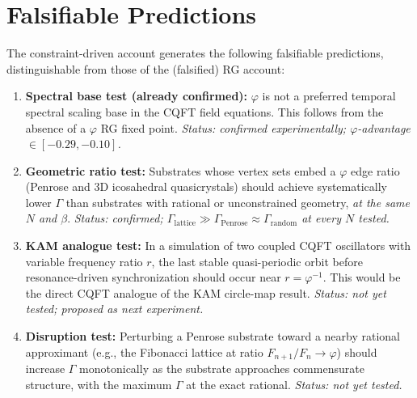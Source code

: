 \documentclass[11pt,a4paper]{article}
\theoremstyle{plain}
\theoremstyle{definition}
\newcommand{\phiGolden}{\varphi}
\begin{document}
\section{Falsifiable Predictions}
\label{sec:predictions}

The constraint-driven account generates the following falsifiable predictions,
distinguishable from those of the (falsified) RG account:

\begin{enumerate}[label=\textbf{P\arabic*.}, leftmargin=*, itemsep=6pt]

  \item \textbf{Spectral base test (already confirmed):}
    $\phiGolden$ is not a preferred temporal spectral scaling base in
    the CQFT field equations. This follows from the absence of a
    $\phiGolden$ RG fixed point. \emph{Status: confirmed experimentally;
    $\phiGolden$-advantage $\in [-0.29, -0.10]$.}

  \item \textbf{Geometric ratio test:}
    Substrates whose vertex sets embed a $\phiGolden$ edge ratio (Penrose
    and 3D icosahedral quasicrystals) should achieve systematically lower
    $\Gamma$ than substrates with rational or unconstrained geometry,
    \emph{at the same $N$ and $\beta$}. \emph{Status: confirmed;
    $\Gamma_{\text{lattice}} \gg \Gamma_{\text{Penrose}} \approx
    \Gamma_{\text{random}}$ at every $N$ tested.}

  \item \textbf{KAM analogue test:}
    In a simulation of two coupled CQFT oscillators with variable
    frequency ratio $r$, the last stable quasi-periodic orbit before
    resonance-driven synchronization should occur near $r = \phiGolden^{-1}$.
    This would be the direct CQFT analogue of the KAM circle-map result.
    \emph{Status: not yet tested; proposed as next experiment.}

  \item \textbf{Disruption test:}
    Perturbing a Penrose substrate toward a nearby rational approximant
    (e.g., the Fibonacci lattice at ratio $F_{n+1}/F_n \to \phiGolden$)
    should increase $\Gamma$ monotonically as the substrate approaches
    commensurate structure, with the maximum $\Gamma$ at the exact
    rational. \emph{Status: not yet tested.}


\end{enumerate}
\end{document}
